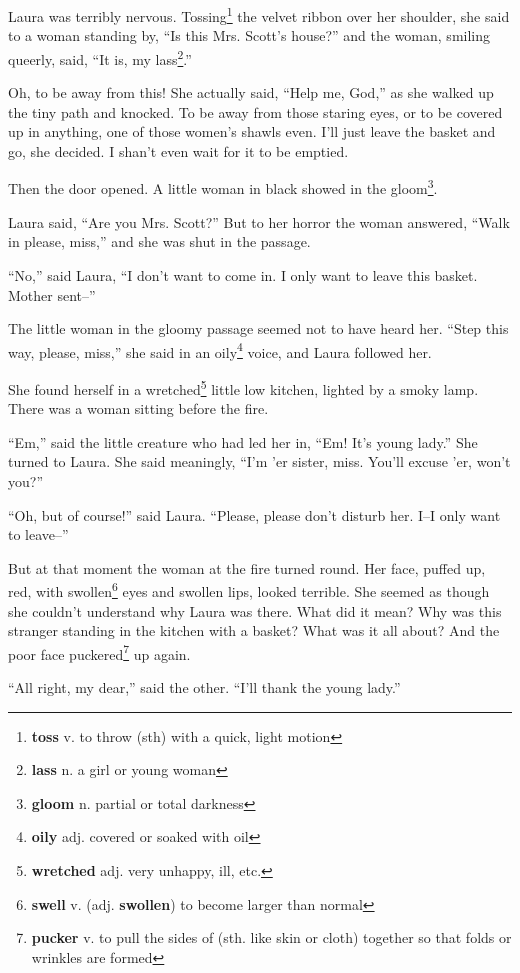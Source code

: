 Laura was terribly nervous. Tossing\footnote{\textbf{toss} v. to throw (sth) with a quick, light motion} the velvet ribbon over her shoulder, she said to a woman standing by, ``Is this Mrs. Scott's house?'' and the woman, smiling queerly, said, ``It is, my lass\footnote{\textbf{lass} n. a girl or young woman}.''

Oh, to be away from this! She actually said, ``Help me, God,'' as she walked up the tiny path and knocked. To be away from those staring eyes, or to be covered up in anything, one of those women's shawls even. I'll just leave the basket and go, she decided. I shan't even wait for it to be emptied.

Then the door opened. A little woman in black showed in the gloom\footnote{\textbf{gloom} n. partial or total darkness}.

Laura said, ``Are you Mrs. Scott?'' But to her horror the woman answered, ``Walk in please, miss,'' and she was shut in the passage.

``No,'' said Laura, ``I don't want to come in. I only want to leave this basket. Mother sent--''

The little woman in the gloomy passage seemed not to have heard her. ``Step this way, please, miss,'' she said in an oily\footnote{\textbf{oily} adj. covered or soaked with oil} voice, and Laura followed her.

She found herself in a wretched\footnote{\textbf{wretched} adj. very unhappy, ill, etc.} little low kitchen, lighted by a smoky lamp. There was a woman sitting before the fire.

``Em,'' said the little creature who had led her in, ``Em! It's young lady.'' She turned to Laura. She said meaningly, ``I'm 'er sister, miss. You'll excuse 'er, won't you?''

``Oh, but of course!'' said Laura. ``Please, please don't disturb her. I--I only want to leave--''

But at that moment the woman at the fire turned round. Her face, puffed up, red, with swollen\footnote{\textbf{swell} v. (adj. \textbf{swollen}) to become larger than normal} eyes and swollen lips, looked terrible. She seemed as though she couldn't understand why Laura was there. What did it mean? Why was this stranger standing in the kitchen with a basket? What was it all about? And the poor face puckered\footnote{\textbf{pucker} v. to pull the sides of (sth. like skin or cloth) together so that folds or wrinkles are formed} up again.

``All right, my dear,'' said the other. ``I'll thank the young lady.''

